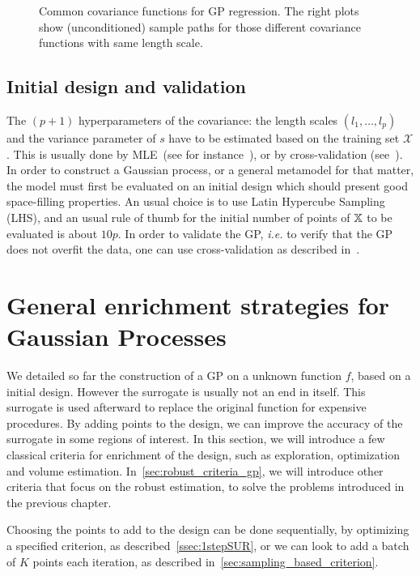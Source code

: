 \documentclass[../../Main_ManuscritThese.tex]{subfiles}
\newcommand\imgpath{/home/victor/acadwriting/Manuscrit/Text/Chapter4/img/}
\begin{document}
\begin{figure}[ht]
  \centering
  
  \caption[Common covariance functions for GP]{\label{fig:cov_fc_examples} Common covariance functions for GP regression. The right plots show (unconditioned) sample paths for those different covariance functions with same length scale.}
\end{figure}

\subsection{Initial design and validation}

The $(p + 1)$ hyperparameters of the covariance: the length scales $(l_1,\dots,l_{p})$ and the variance parameter of $s$ have to be estimated based on the training set $\mathcal{X}$. This is usually done by MLE~(see for instance~\cite{ribaud_robustness_2019}), or by cross-validation (see~\cite{ginsbourger_note_2009}).
In order to construct a Gaussian process, or a general metamodel for that matter, the model must first be evaluated on an initial design which should present good space-filling properties. An usual choice is to use Latin Hypercube Sampling (LHS), and an usual rule of thumb for the initial number of points of $\mathbb{X}$ to be evaluated is about $10p$. In order to validate the GP, \emph{i.e.} to verify that the GP does not overfit the data, one can use cross-validation as described in~\cite{dubrule_cross_1983}.


\section{General enrichment strategies for Gaussian Processes}
\label{sec:enrichment_strategies}
We detailed so far the construction of a GP on a unknown function $f$, based on a initial design. However the surrogate is usually not an end in itself. This surrogate is used afterward to replace the original function for expensive procedures.
By adding points to the design, we can improve the accuracy of the surrogate in some regions of interest. In this section, we will introduce a few classical criteria for enrichment of the design, such as exploration, optimization and volume estimation.
In~\cref{sec:robust_criteria_gp}, we will introduce other criteria that focus on the robust estimation, to solve the problems introduced in the previous chapter.

Choosing the points to add to the design can be done sequentially, by optimizing a specified criterion, as described~\cref{ssec:1stepSUR}, or we can look to add a batch of $K$ points each iteration, as described in~\cref{sec:sampling_based_criterion}.
\end{document}
